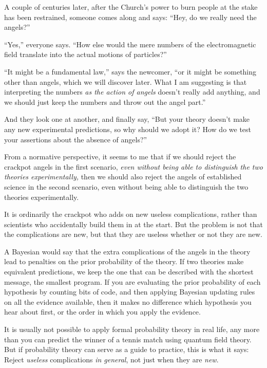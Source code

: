 {
 A couple of centuries later, after the Church's
power to burn people at the stake has been restrained, someone comes
along and says: ``Hey, do we really need the
angels?''}

{
 ``Yes,'' everyone says.
``How else would the mere numbers of the
electromagnetic field translate into the actual motions of
particles?''}

{
 ``It might be a fundamental
law,'' says the newcomer, ``or it
might be something other than angels, which we will discover later.
What I am suggesting is that interpreting the numbers \textit{as the
action of angels} doesn't really add anything, and we
should just keep the numbers and throw out the angel
part.''}

{
 And they look one at another, and finally say,
``But your theory doesn't make any new
experimental predictions, so why should we adopt it? How do we test
your assertions about the absence of angels?''}

{
 From a normative perspective, it seems to me that if we should
reject the crackpot angels in the first scenario, \textit{even without
being able to distinguish the two theories experimentally,} then we
should also reject the angels of established science in the second
scenario, even without being able to distinguish the two theories
experimentally.}

{
 It is ordinarily the crackpot who adds on new useless
complications, rather than scientists who accidentally build them in at
the start. But the problem is not that the complications are new, but
that they are useless whether or not they are new.}

{
 A Bayesian would say that the extra complications of the angels in
the theory lead to penalties on the prior probability of the theory. If
two theories make equivalent predictions, we keep the one that can be
described with the shortest message, the smallest program. If you are
evaluating the prior probability of each hypothesis by counting bits of
code, and then applying Bayesian updating rules on all the evidence
available, then it makes no difference which hypothesis you hear about
first, or the order in which you apply the evidence.}

{
 It is usually not possible to apply formal probability theory in
real life, any more than you can predict the winner of a tennis match
using quantum field theory. But if probability theory can serve as a
guide to practice, this is what it says: Reject \textit{useless}
complications \textit{in general}, not just when they are
\textit{new}.}

